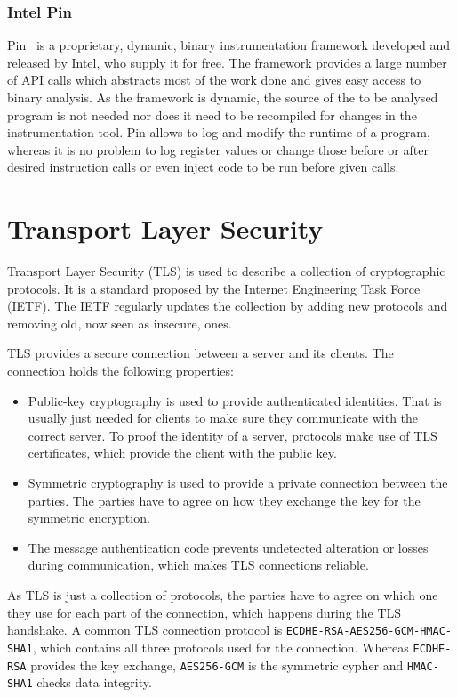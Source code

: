 
\subsubsection{Intel Pin}

Pin~\cite{pintool} is a proprietary, dynamic, binary instrumentation framework
developed and released by Intel, who supply it for free. The framework provides
a large number of API calls which abstracts most of the work done and gives easy
access to binary analysis. As the framework is dynamic, the source of the to be
analysed program is not needed nor does it need to be recompiled for changes in
the instrumentation tool. Pin allows to log and modify the runtime of a program,
whereas it is no problem to log register values or change those before or after
desired instruction calls or even inject code to be run before given calls.

\section{Transport Layer Security}

Transport Layer Security (TLS) is used to describe a collection of cryptographic
protocols. It is a standard proposed by the Internet Engineering Task Force
(IETF). The IETF regularly updates the collection by adding new protocols and
removing old, now seen as insecure, ones.

TLS provides a secure connection between a server and its clients. The
connection holds the following properties:
\begin{itemize}
  \item Public-key cryptography is used to provide authenticated identities.
  That is usually just needed for clients to make sure they communicate with the
  correct server. To proof the identity of a server, protocols make use of TLS
  certificates, which provide the client with the public key.
  \item Symmetric cryptography is used to provide a private connection between
  the parties. The parties have to agree on how they exchange the key for the
  symmetric encryption.
  \item The message authentication code prevents undetected alteration
  or losses during communication, which makes TLS connections reliable.
\end{itemize}

As TLS is just a collection of protocols, the parties have to agree on which one
they use for each part of the connection, which happens during the TLS
handshake. A common TLS connection protocol is
\texttt{ECDHE-RSA-AES256-GCM-HMAC-SHA1}, which contains all three protocols used
for the connection. Whereas \texttt{ECDHE-RSA} provides the key exchange,
\texttt{AES256-GCM} is the  symmetric cypher and \texttt{HMAC-SHA1} checks data
integrity.

